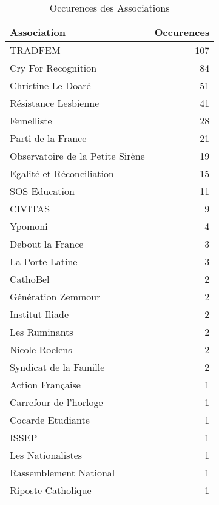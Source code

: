 \begin{table}

\caption{Occurences des Associations}
\centering
\begin{tabular}[t]{l|r}
\hline
Association & Occurences\\
\hline
TRADFEM & 107\\
\hline
Cry For Recognition & 84\\
\hline
Christine Le Doaré & 51\\
\hline
Résistance Lesbienne & 41\\
\hline
Femelliste & 28\\
\hline
Parti de la France & 21\\
\hline
Observatoire de la Petite Sirène & 19\\
\hline
Egalité et Réconciliation & 15\\
\hline
SOS Education & 11\\
\hline
CIVITAS & 9\\
\hline
Ypomoni & 4\\
\hline
Debout la France & 3\\
\hline
La Porte Latine & 3\\
\hline
CathoBel & 2\\
\hline
Génération Zemmour & 2\\
\hline
Institut Iliade & 2\\
\hline
Les Ruminants & 2\\
\hline
Nicole Roelens & 2\\
\hline
Syndicat de la Famille & 2\\
\hline
Action Française & 1\\
\hline
Carrefour de l'horloge & 1\\
\hline
Cocarde Etudiante & 1\\
\hline
ISSEP & 1\\
\hline
Les Nationalistes & 1\\
\hline
Rassemblement National & 1\\
\hline
Riposte Catholique & 1\\
\hline
\end{tabular}
\end{table}
